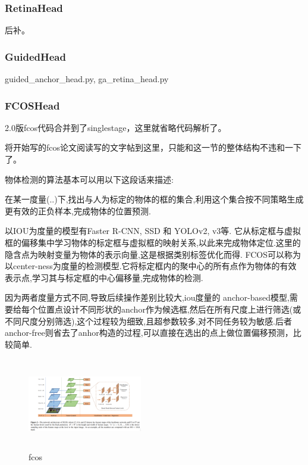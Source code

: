 \documentclass[UTF8]{ctexart}
\begin{document}
\subsubsection{RetinaHead}
后补。
\subsubsection{GuidedHead}
guided\_anchor\_head.py, ga\_retina\_head.py

\subsubsection{FCOSHead}
2.0版fcos代码合并到了singlestage，这里就省略代码解析了。

将开始写的fcos论文阅读写的文字帖到这里，只能和这一节的整体结构不违和一下了。

物体检测的算法基本可以用以下这段话来描述:

在某一度量(..)下,找出与人为标定的物体的框的集合,利用这个集合按不同策略生成更有效的正负样本,完成物体的位置预测.

以IOU为度量的模型有Faster R-CNN, SSD 和 YOLOv2, v3等.
它从标定框与虚拟框的偏移集中学习物体的标定框与虚拟框的映射关系,以此来完成物体定位.这里的隐含点为映射变量为物体的表示向量,这是根据类别标签优化而得. FCOS可以称为以center-ness为度量的检测模型.它将标定框内的聚中心的所有点作为物体的有效表示点,学习其与标定框的中心偏移量,完成物体的检测.

因为两者度量方式不同,导致后续操作差别比较大,iou度量的
anchor-based模型,需要给每个位置点设计不同形状的anchor作为候选框,然后在所有尺度上进行筛选(或不同尺度分别筛选),这个过程较为细致,且超参数较多,对不同任务较为敏感.后者anchor-free则省去了anhor构造的过程,可以直接在选出的点上做位置偏移预测，比较简单.


\begin{figure}[htbp]
	\centering
	\begin{minipage}[t]{0.9\textwidth}
	\centering
	\includegraphics[width=5cm, height=4cm]{./pic/fcos_struct.png}
	\caption{fcos}
	\label{picfcos}
	\end{minipage}
\end{figure}
\end{document}
